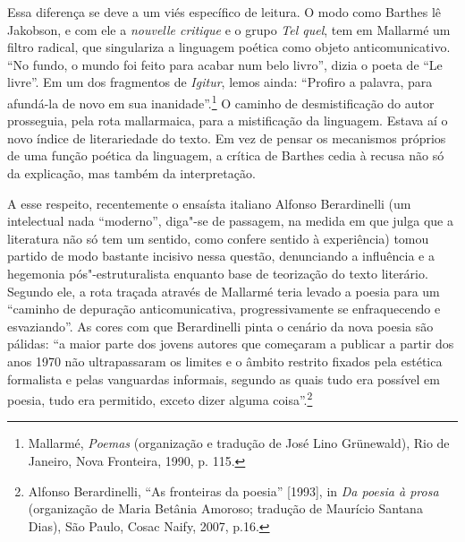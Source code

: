 Essa diferença se deve a um viés específico de leitura. O modo como
Barthes lê Jakobson, e com ele a \emph{nouvelle critique} e o grupo \emph{Tel quel},
tem em Mallarmé um filtro radical, que singulariza a linguagem poética
como objeto anticomunicativo. ``No fundo, o mundo foi feito para acabar
num belo livro'', dizia o poeta de ``Le livre''. Em um dos fragmentos de
\emph{Igitur}, lemos ainda: ``Profiro a palavra, para afundá-la de novo em sua
inanidade''.\footnote{Mallarmé, \emph{Poemas} (organização e tradução de
  José Lino Grünewald), Rio de Janeiro, Nova Fronteira, 1990, p. 115.} O
caminho de desmistificação do autor prosseguia, pela rota mallarmaica,
para a mistificação da linguagem. Estava aí o novo índice de
literariedade do texto. Em vez de pensar os mecanismos próprios de uma
função poética da linguagem, a crítica de Barthes cedia à recusa não só
da explicação, mas também da interpretação.

A esse respeito, recentemente o ensaísta italiano Alfonso Berardinelli
(um intelectual nada ``moderno'', diga"-se de passagem, na medida em que
julga que a literatura não só tem um sentido, como confere sentido à
experiência) tomou partido de modo bastante incisivo nessa questão,
denunciando a influência e a hegemonia pós"-estruturalista enquanto base
de teorização do texto literário. Segundo ele, a rota traçada através de
Mallarmé teria levado a poesia para um ``caminho de depuração
anticomunicativa, progressivamente se enfraquecendo e esvaziando''. As
cores com que Berardinelli pinta o cenário da nova poesia são pálidas:
``a maior parte dos jovens autores que começaram a publicar a partir dos
anos 1970 não ultrapassaram os limites e o âmbito restrito fixados pela
estética formalista e pelas vanguardas informais, segundo as quais tudo
era possível em poesia, tudo era permitido, exceto dizer alguma
coisa''.\footnote{Alfonso Berardinelli, ``As fronteiras da poesia''
  {[}1993{]}, in \emph{Da poesia à prosa} (organização de Maria Betânia
  Amoroso; tradução de Maurício Santana Dias), São Paulo, Cosac Naify,
  2007, p.16.}


